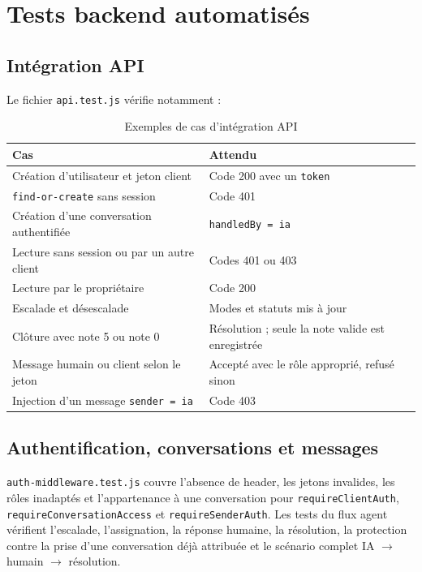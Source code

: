 \section{Tests backend automatisés}

\subsection{Intégration API}

Le fichier \texttt{api.test.js} vérifie notamment :

\begin{table}[H]
\centering
\caption{Exemples de cas d'intégration API}
\label{tab:t-api}
\small
\begin{tabularx}{\textwidth}{|X|l|}
\hline
Cas & Attendu \\
\hline
Création d'utilisateur et jeton client & Code 200 avec un \texttt{token} \\
\hline
\texttt{find-or-create} sans session & Code 401 \\
\hline
Création d'une conversation authentifiée & \texttt{handledBy = ia} \\
\hline
Lecture sans session ou par un autre client & Codes 401 ou 403 \\
\hline
Lecture par le propriétaire & Code 200 \\
\hline
Escalade et désescalade & Modes et statuts mis à jour \\
\hline
Clôture avec note 5 ou note 0 & Résolution ; seule la note valide est enregistrée \\
\hline
Message humain ou client selon le jeton & Accepté avec le rôle approprié, refusé sinon \\
\hline
Injection d'un message \texttt{sender = ia} & Code 403 \\
\hline
\end{tabularx}
\end{table}

\subsection{Authentification, conversations et messages}

\texttt{auth-middleware.test.js} couvre l'absence de header, les jetons invalides, les rôles inadaptés et l'appartenance à une conversation pour \texttt{requireClientAuth}, \texttt{requireConversationAccess} et \texttt{requireSenderAuth}. Les tests du flux agent vérifient l'escalade, l'assignation, la réponse humaine, la résolution, la protection contre la prise d'une conversation déjà attribuée et le scénario complet IA $\rightarrow$ humain $\rightarrow$ résolution.

